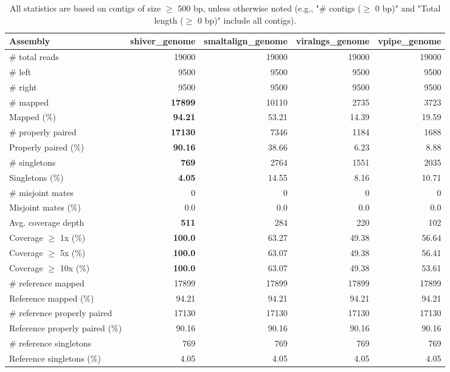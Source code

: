 \documentclass[12pt,a4paper]{article}
\begin{document}
\begin{table}[ht]
\begin{center}
\caption{All statistics are based on contigs of size $\geq$ 500 bp, unless otherwise noted (e.g., "\# contigs ($\geq$ 0 bp)" and "Total length ($\geq$ 0 bp)" include all contigs).}
\begin{tabular}{|l*{4}{|r}|}
\hline
Assembly & shiver\_genome & smaltalign\_genome & viralngs\_genome & vpipe\_genome \\ \hline
\# total reads & 19000 & 19000 & 19000 & 19000 \\ \hline
\# left & 9500 & 9500 & 9500 & 9500 \\ \hline
\# right & 9500 & 9500 & 9500 & 9500 \\ \hline
\# mapped & {\bf 17899} & 10110 & 2735 & 3723 \\ \hline
Mapped (\%) & {\bf 94.21} & 53.21 & 14.39 & 19.59 \\ \hline
\# properly paired & {\bf 17130} & 7346 & 1184 & 1688 \\ \hline
Properly paired (\%) & {\bf 90.16} & 38.66 & 6.23 & 8.88 \\ \hline
\# singletons & {\bf 769} & 2764 & 1551 & 2035 \\ \hline
Singletons (\%) & {\bf 4.05} & 14.55 & 8.16 & 10.71 \\ \hline
\# misjoint mates & 0 & 0 & 0 & 0 \\ \hline
Misjoint mates (\%) & 0.0 & 0.0 & 0.0 & 0.0 \\ \hline
Avg. coverage depth & {\bf 511} & 284 & 220 & 102 \\ \hline
Coverage $\geq$ 1x (\%) & {\bf 100.0} & 63.27 & 49.38 & 56.64 \\ \hline
Coverage $\geq$ 5x (\%) & {\bf 100.0} & 63.07 & 49.38 & 56.41 \\ \hline
Coverage $\geq$ 10x (\%) & {\bf 100.0} & 63.07 & 49.38 & 53.61 \\ \hline
\# reference mapped & 17899 & 17899 & 17899 & 17899 \\ \hline
Reference mapped (\%) & 94.21 & 94.21 & 94.21 & 94.21 \\ \hline
\# reference properly paired & 17130 & 17130 & 17130 & 17130 \\ \hline
Reference properly paired (\%) & 90.16 & 90.16 & 90.16 & 90.16 \\ \hline
\# reference singletons & 769 & 769 & 769 & 769 \\ \hline
Reference singletons (\%) & 4.05 & 4.05 & 4.05 & 4.05 \\ \hline

\end{tabular}
\end{center}
\end{table}
\end{document}
